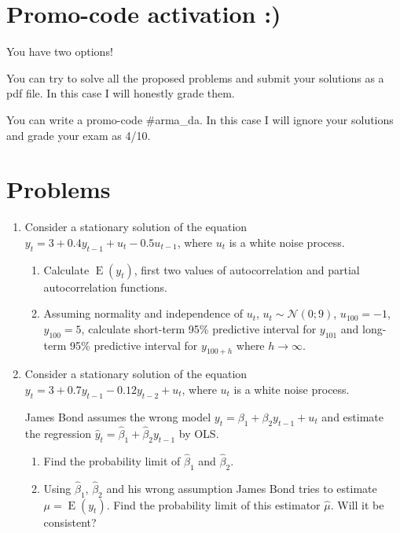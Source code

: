 \documentclass[12pt]{article}
\DeclareMathOperator{\E}{E}
\def \cN{\mathcal{N}}
\begin{document}
\section*{Promo-code activation :)}

You have two options! 

You can try to solve all the proposed problems and submit your solutions as a pdf file.
In this case I will honestly grade them.

You can write a promo-code \#arma\_da. 
In this case I will ignore your solutions and grade your exam as 4/10. 

\section*{Problems}

\begin{enumerate}

\item Consider a stationary solution of the equation $y_t = 3 + 0.4y_{t-1} + u_t - 0.5u_{t-1}$, 
	where $u_t$ is a white noise process. 

\begin{enumerate}
	\item Calculate $\E(y_t)$, first two values of autocorrelation and partial autocorrelation functions.
	\item Assuming normality and independence of $u_t$, $u_t \sim \cN(0; 9)$, $u_{100}=-1$, $y_{100}=5$, 
	calculate short-term 95\% predictive interval for $y_{101}$ and long-term 95\% predictive interval for $y_{100+h}$ 
	where $h \to \infty$.
\end{enumerate}
	


\item Consider a stationary solution of the equation $y_t = 3 + 0.7y_{t-1} -0.12y_{t-2} + u_t$, 
where $u_t$ is a white noise process. 

James Bond assumes the wrong model $y_t = \beta_1 + \beta_2 y_{t-1} + u_t$ 
and estimate the regression $\hat y_t = \hat\beta_1 + \hat\beta_2 y_{t-1}$ by OLS.

\begin{enumerate}
	\item Find the probability limit of $\hat\beta_1$ and $\hat\beta_2$. 
	\item Using $\hat\beta_1$, $\hat\beta_2$ and his wrong assumption James Bond tries to estimate $\mu = \E(y_t)$. 
	Find the probability limit of this estimator $\hat\mu$. Will it be consistent?
\end{enumerate}


\end{enumerate}
\end{document}
